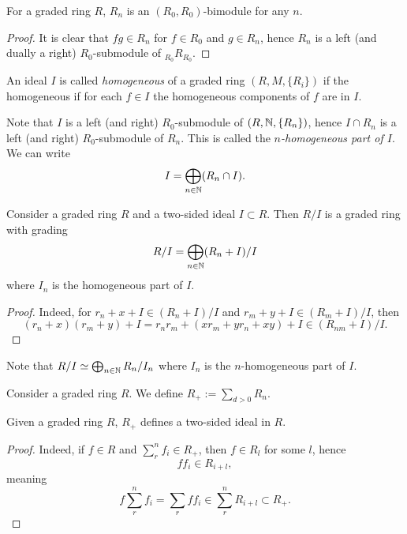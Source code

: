     \begin{proposition}
        For a graded ring $R$, $R_n$ is an $(R_0,R_0)$-bimodule for any $n$.
    \end{proposition}
    \begin{proof}
        It is clear that $fg\in R_n$ for $f\in R_0$ and $g\in R_n$, hence $R_n$ is a left (and dually a right) $R_0$-submodule of $_{R_0}R_{R_0}$.         
    \end{proof}
    \begin{definition}
        An ideal $I$ is called \emph{homogeneous} of a graded ring $(R,M,\{R_i\})$ if the homogeneous if for each $f\in I$ the homogeneous components of $f$ are in $I$.
    \end{definition}
    \begin{remark}
        Note that $I$ is a left (and right) $R_0$-submodule of $(R,\mathbb{N},\{R_n\})$, hence $I\cap R_n$ is a left (and right) $R_0$-submodule of $R_n$. This is called the \emph{$n$-homogeneous part of $I$}. We can write 
        $$
            I = \bigoplus_{n\in \mathbb{N}} (R_n\cap I).
        $$
    \end{remark}
    \begin{lemma}
        Consider a graded ring $R$ and a two-sided ideal $I\subset R$. Then $R/I$ is a graded ring with grading 
        $$
            R/I = \bigoplus_{n\in \mathbb{N}} (R_n+I)/I
        $$
        where $I_n$ is the homogeneous part of $I$.  
    \end{lemma}
    \begin{proof}
        Indeed, for $r_n+x+I\in (R_n+I)/I$ and $r_m+y+I\in (R_m+I)/I$, then 
        $$
            (r_n+x)(r_m+y)+I=r_nr_m+(xr_m+yr_n+xy)+I\in (R_{nm}+I)/I.
        $$ 
    \end{proof}
    \begin{remark}
        Note that $R/I\simeq \bigoplus_{n\in \mathbb{N}} R_n/I_n$ where $I_n$ is the $n$-homogeneous part of $I$.
    \end{remark}
    \begin{definition}
        Consider a graded ring $R$. We define $R_{+} := \sum_{d>0} R_n$.
    \end{definition}
    \begin{lemma}
        Given a graded ring $R$, $R_{+}$ defines a two-sided ideal in $R$.
    \end{lemma}
    \begin{proof}
        Indeed, if $f\in R$ and $\sum_r^n f_i\in R_{+}$, then $f\in R_l$ for some $l$, hence 
        $$
            ff_i\in R_{i+l},
        $$
        meaning 
        $$
            f\sum_r^n f_i = \sum_r ff_i\in \sum_r^n R_{i+l}\subset R_{+}.
        $$
    \end{proof}
